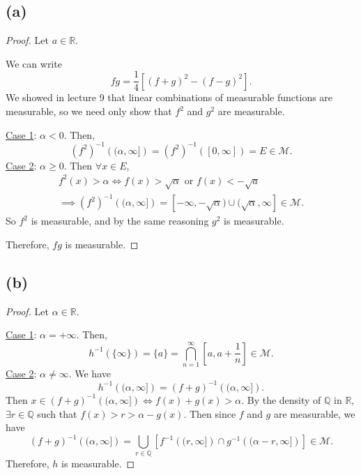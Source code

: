 \documentclass{article}
\newcommand{\R}{\mathbb{R}} %
\newcommand{\M}{\mathcal{M}} %
\newcommand{\Q}{\mathbb{Q}} %
\begin{document}
\subsection*{(a)}
\begin{proof}
	Let $a \in \R$.
	
	We can write
	\begin{equation}
		fg = \frac{1}{4}\left[(f+g)^2 - (f-g)^2\right].
	\end{equation}
	We showed in lecture 9 that linear combinations of measurable functions are measurable, so we need only show that $f^2$ and $g^2$ are measurable.
	
	\underline{Case 1}: $\alpha < 0$. Then,
	\begin{equation}
		(f^2)^{-1}\left((\alpha, \infty]\right) = (f^2)^{-1}\left([0,\infty]\right) = E \in \M.
	\end{equation}
	\underline{Case 2}: $\alpha \geq 0$. Then $\forall x \in E$,
	\begin{align}
		f^2(x) > \alpha \iff f(x) > \sqrt{\alpha} \textrm{ or } f(x) < -\sqrt{a} \\
		\implies (f^2)^{-1}\left((\alpha, \infty]\right) = [-\infty, -\sqrt{\alpha}) \cup (\sqrt{\alpha}, \infty] \in \M.
	\end{align}
	So $f^2$ is measurable, and by the same reasoning $g^2$ is measurable.
	
	Therefore, $fg$ is measurable.
\end{proof}

\subsection*{(b)}
\begin{proof}
	Let $\alpha \in \R$.
	
	\underline{Case 1}: $\alpha = +\infty$. Then,
	\begin{equation}
		h^{-1}(\{\infty\}) = \{a\} = \bigcap_{n=1}^{\infty}\left[a, a + \frac{1}{n}\right] \in \M.
	\end{equation}
	\underline{Case 2}: $\alpha \neq \infty$. We have
	\begin{equation}
		h^{-1}\left((\alpha, \infty]\right) = (f+g)^{-1}\left((\alpha, \infty]\right).
	\end{equation}
	Then $x \in (f+g)^{-1}\left((\alpha, \infty]\right) \iff f(x) + g(x) > \alpha$. By the density of $\Q$ in $\R$, $\exists r \in \Q$ such that $f(x) > r > \alpha - g(x)$. Then since $f$ and $g$ are measurable, we have
	\begin{equation}
		(f+g)^{-1}\left((\alpha, \infty]\right) = \bigcup_{r \in \Q} \left[f^{-1}\left((r,\infty]\right) \cap g^{-1}\left((\alpha - r,\infty]\right)\right] \in \M.
	\end{equation}
	Therefore, $h$ is measurable.
\end{proof}
\end{document}
